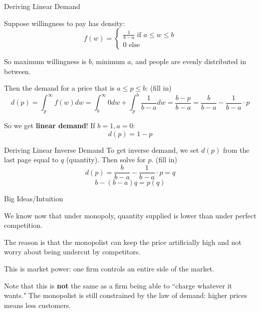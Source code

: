 \documentclass[aspectratio=169]{beamer}
\newenvironment{wideitemize}{\itemize\addtolength{\itemsep}{10pt}}{\enditemize}
\begin{document}
\begin{frame}{Deriving Linear Demand}
\begin{wideitemize}
        \item Suppose willingness to pay has density:
        \[f(w) = \begin{cases} \frac{1}{b-a} \text{ if } a\leq w\leq b\\
        0 \text{ else } \end{cases}\]
        \item So maximum willingness is $b$, minimum $a$, and people are evenly distributed in between.
        \item Then the demand for a price that is $a \leq p \leq b$: (fill in) \pause
        \[d(p)=\int^{\infty}_p f(w) dw= \int^{\infty}_b 0 dw + \int^{b}_p\frac{1}{b-a}  dw =\frac{b-p}{b-a} = \frac{b}{b-a} - \frac{1}{b-a}\cdot p  \]
        \item So we get \textbf{linear demand}! If $b=1, a=0$:
        \[d(p)=1-p\]
    
\end{wideitemize}
\end{frame}

\begin{frame}{Deriving Linear Inverse Demand}
To get inverse demand, we set $d(p)$ from the last page equal to $q$ (quantity). Then solve for $p$. (fill in) \pause 
\[d(p)= \frac{b}{b-a} - \frac{1}{b-a}\cdot p =q \]
\[b - (b-a)q =p(q) \]
\end{frame}


\begin{frame}{Big Ideas/Intuition}
\begin{wideitemize}
        \item We know now that under monopoly, quantity supplied is lower than under perfect competition.
        \item The reason is that the monopolist can keep the price artificially high and not worry about being undercut by competitors. 
        \item This is market power: one firm controls an entire side of the market.
        \item Note that this is \textbf{not} the same as a firm being able to ``charge whatever it wants." The monopolist is still constrained by the law of demand: higher prices means less customers.
\end{wideitemize}
\end{frame}
\end{document}

